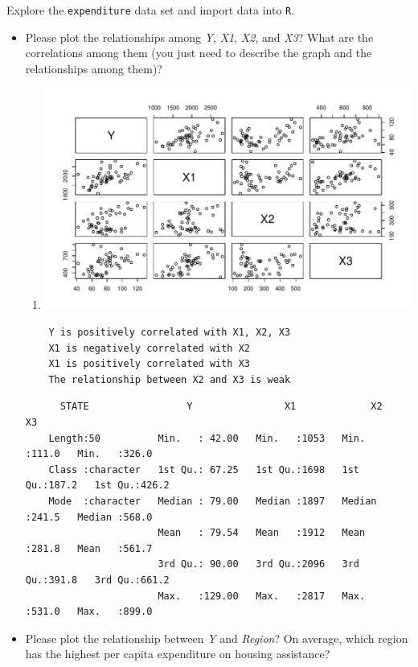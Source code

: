 \documentclass[12pt,letterpaper]{article}
\begin{document}
\vspace{.5cm}
\noindent Explore the \texttt{expenditure} data set and import data into \texttt{R}.
\vspace{.5cm}
  
\vspace{.5cm}
\begin{itemize}

\item
Please plot the relationships among \emph{Y}, \emph{X1}, \emph{X2}, and \emph{X3}? What are the correlations among them (you just need to describe the graph and the relationships among them)?


    \begin{enumerate}
	\item[]
	\includegraphics[width=.85\textwidth]{plot.all relationship_RJ.C.pdf}
   \end{enumerate}
   \begin{verbatim}
   	Y is positively correlated with X1, X2, X3
   	X1 is negatively correlated with X2
   	X1 is positively correlated with X3
   	The relationship between X2 and X3 is weak
   \end{verbatim}

	\begin{verbatim}
	  STATE                 Y                X1             X2              X3       
	Length:50          Min.   : 42.00   Min.   :1053   Min.   :111.0   Min.   :326.0  
	Class :character   1st Qu.: 67.25   1st Qu.:1698   1st Qu.:187.2   1st Qu.:426.2  
	Mode  :character   Median : 79.00   Median :1897   Median :241.5   Median :568.0  
	                   Mean   : 79.54   Mean   :1912   Mean   :281.8   Mean   :561.7  
	                   3rd Qu.: 90.00   3rd Qu.:2096   3rd Qu.:391.8   3rd Qu.:661.2  
	                   Max.   :129.00   Max.   :2817   Max.   :531.0   Max.   :899.0 
  \end{verbatim} 
\vspace{.5cm}
\item
Please plot the relationship between \emph{Y} and \emph{Region}? On average, which region has the highest per capita expenditure on housing assistance?


\end{itemize}
\end{document}
